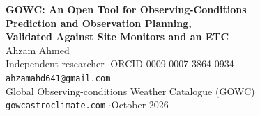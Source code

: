 \documentclass[11pt]{article}
\begin{document}
\begin{center}
{\LARGE\bfseries GOWC: An Open Tool for Observing-Conditions}\\[3pt]
{\LARGE\bfseries Prediction and Observation Planning,}\\[3pt]
{\LARGE\bfseries Validated Against Site Monitors and an ETC}\\[12pt]
{\large Ahzam Ahmed}\\[4pt]
{\normalsize Independent researcher \quad$\cdot$\quad ORCID 0009-0007-3864-0934}\\[2pt]
{\normalsize \texttt{ahzamahd641@gmail.com}}\\[2pt]
{\normalsize Global Observing-conditions Weather Catalogue (GOWC)}\\[2pt]
{\small \texttt{gowcastroclimate.com} \quad$\cdot$\quad October 2026}
\end{center}

\vspace{8pt}
\end{document}
